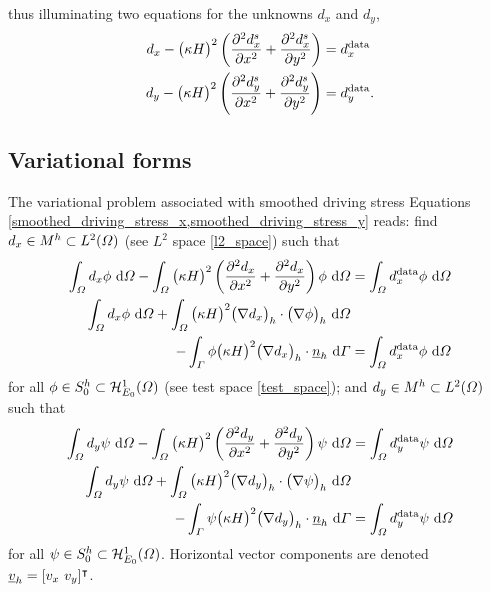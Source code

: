 thus illuminating two equations for the unknowns $d_x$ and $d_y$,
\begin{align}
  \label{smoothed_driving_stress_x}
  d_x - \big( \kappa H \big)^2 \left( \parder[2]{d_x^s}{x} + \parder[2]{d_x^s}{y} \right) &= d_x^{\text{data}} \\
  \label{smoothed_driving_stress_y}
  d_y - \big( \kappa H \big)^2 \left( \parder[2]{d_y^s}{x} + \parder[2]{d_y^s}{y} \right) &= d_y^{\text{data}}.
\end{align}

\subsection{Variational forms}

The variational problem associated with smoothed driving stress Equations \cref{smoothed_driving_stress_x,smoothed_driving_stress_y} reads: find $d_x \in \ltwospace$ (see $L^2$ space \cref{l2_space}) such that
\begin{align*}
  \int_{\Omega} d_x \phi \d{\Omega} - \int_{\Omega} \big( \kappa H \big)^2 \left( \parder[2]{d_x}{x} + \parder[2]{d_x}{y} \right) \phi \d{\Omega} &= \int_{\Omega} d_x^{\text{data}} \phi \d{\Omega} \\
  \int_{\Omega} d_x \phi \d{\Omega} + \int_{\Omega} \big( \kappa H \big)^2 \big( \nabla d_x \big)_h \cdot \big( \nabla \phi \big)_h \d{\Omega} &\\
  - \int_{\Gamma} \phi \big( \kappa H \big)^2 \big( \nabla d_x \big)_h \cdot \rankone{n}_h \d{\Gamma} &= \int_{\Omega} d_x^{\text{data}} \phi \d{\Omega}
\end{align*}
for all $\phi \in \testspace$ (see test space \cref{test_space}); and $d_y \in \ltwospace$ such that
\begin{align*}
  \int_{\Omega} d_y \psi \d{\Omega} - \int_{\Omega} \big( \kappa H \big)^2 \left( \parder[2]{d_y}{x} + \parder[2]{d_y}{y} \right) \psi \d{\Omega} &= \int_{\Omega} d_y^{\text{data}} \psi \d{\Omega} \\
  \int_{\Omega} d_y \psi \d{\Omega} + \int_{\Omega} \big( \kappa H \big)^2 \big( \nabla d_y \big)_h \cdot \big( \nabla \psi \big)_h \d{\Omega} &\\
  - \int_{\Gamma} \psi \big( \kappa H \big)^2 \big( \nabla d_y \big)_h \cdot \rankone{n}_h \d{\Gamma} &= \int_{\Omega} d_y^{\text{data}} \psi \d{\Omega}
\end{align*}
for all $\psi \in \testspace$.  Horizontal vector components are denoted $\rankone{v}_h = [v_x\ v_y]\T$.

